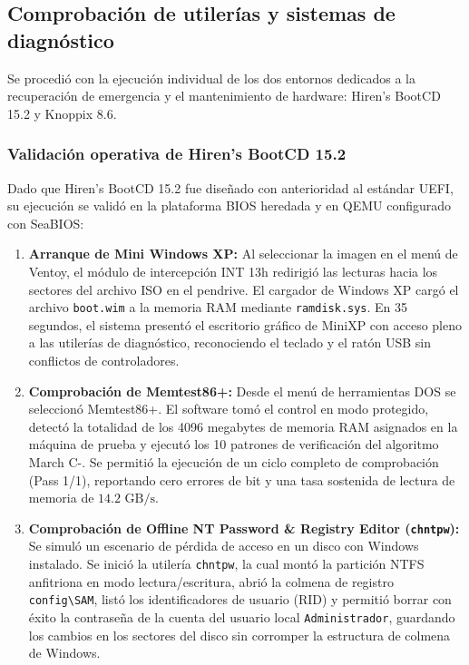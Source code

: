 \documentclass[12pt]{article}
\begin{document}
\subsection{Comprobación de utilerías y sistemas de diagnóstico}
\label{sec:comprobacionDiagnostico}

Se procedió con la ejecución individual de los dos entornos dedicados a la recuperación de emergencia y el mantenimiento de hardware: Hiren's BootCD 15.2 y Knoppix 8.6.

\subsubsection{Validación operativa de Hiren's BootCD 15.2}

Dado que Hiren's BootCD 15.2 fue diseñado con anterioridad al estándar UEFI, su ejecución se validó en la plataforma BIOS heredada y en QEMU configurado con SeaBIOS:
\begin{enumerate}[noitemsep, topsep=2pt]
    \item \textbf{Arranque de Mini Windows XP:}
    Al seleccionar la imagen en el menú de Ventoy, el módulo de intercepción INT 13h redirigió las lecturas hacia los sectores del archivo ISO en el pendrive. El cargador de Windows XP cargó el archivo \texttt{boot.wim} a la memoria RAM mediante \texttt{ramdisk.sys}. En 35 segundos, el sistema presentó el escritorio gráfico de MiniXP con acceso pleno a las utilerías de diagnóstico, reconociendo el teclado y el ratón USB sin conflictos de controladores.
    \item \textbf{Comprobación de Memtest86+:}
    Desde el menú de herramientas DOS se seleccionó Memtest86+. El software tomó el control en modo protegido, detectó la totalidad de los 4096 megabytes de memoria RAM asignados en la máquina de prueba y ejecutó los 10 patrones de verificación del algoritmo March C-. Se permitió la ejecución de un ciclo completo de comprobación (Pass 1/1), reportando cero errores de bit y una tasa sostenida de lectura de memoria de $14.2 \text{ GB/s}$.
    \item \textbf{Comprobación de Offline NT Password \& Registry Editor (\texttt{chntpw}):}
    Se simuló un escenario de pérdida de acceso en un disco con Windows instalado. Se inició la utilería \texttt{chntpw}, la cual montó la partición NTFS anfitriona en modo lectura/escritura, abrió la colmena de registro \texttt{config\textbackslash SAM}, listó los identificadores de usuario (RID) y permitió borrar con éxito la contraseña de la cuenta del usuario local \texttt{Administrador}, guardando los cambios en los sectores del disco sin corromper la estructura de colmena de Windows.
\end{enumerate}
\end{document}
